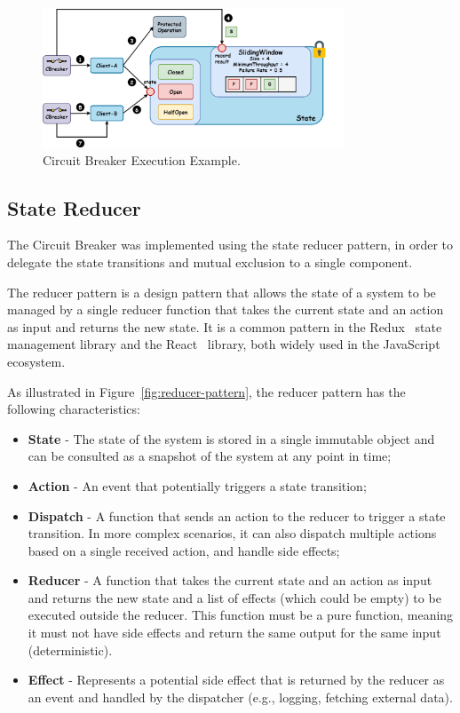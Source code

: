 \begin{figure}[!htb]
    \centering
    \includegraphics[width=0.8\textwidth]{../figures/05_cbreaker-execution-example}
    \caption{Circuit Breaker Execution Example.}
    \label{fig:circuit-breaker-execution-example}
\end{figure}

\subsection{State Reducer}\label{subsec:cbreaker-state-reducer}

The Circuit Breaker was implemented using the state reducer pattern,
in order to delegate the state transitions and mutual exclusion to a single component.

The reducer pattern is a design pattern
that allows the state of a system
to be managed by a single reducer function
that takes the current state and an action as input and returns the new state.
It is a common pattern in the Redux~\cite{redux} state management library and the React~\cite{react-use-reducer} library,
both widely used in the JavaScript ecosystem.

As illustrated in Figure~\ref{fig:reducer-pattern}, the reducer pattern has the following characteristics:

\begin{itemize}
    \item \textbf{State} - The state of the system is stored in a single immutable object and can be consulted as a snapshot of the system at any point in time;
    \item \textbf{Action} - An event that potentially triggers a state transition;
    \item \textbf{Dispatch} - A function that sends an action to the reducer to trigger a state transition.
    In more complex scenarios, it can also dispatch multiple actions based on a single received action, and handle side effects;
    \item \textbf{Reducer} - A function that takes the current state and an action as input and returns the new state and a list of effects (which could be empty) to be executed outside the reducer.
    This function must be a pure function, meaning it must not have side effects and return the same output for the same input (deterministic).
    \item \textbf{Effect} -
    Represents a potential side effect that is returned by the reducer as an event and handled by the dispatcher (e.g., logging, fetching external data).
\end{itemize}

